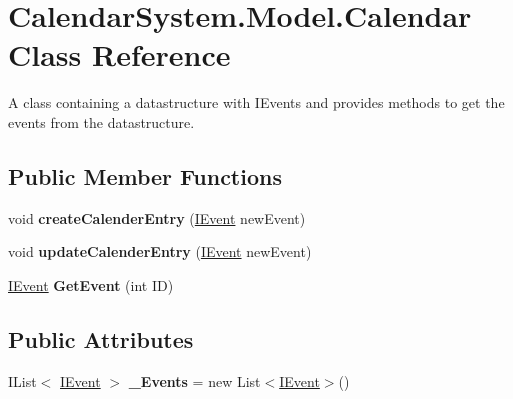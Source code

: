 \hypertarget{class_calendar_system_1_1_model_1_1_calendar}{\section{Calendar\+System.\+Model.\+Calendar Class Reference}
\label{class_calendar_system_1_1_model_1_1_calendar}
}


A class containing a datastructure with I\+Events and provides methods to get the events from the datastructure.  


\subsection*{Public Member Functions}
\begin{DoxyCompactItemize}
\item 
\hypertarget{class_calendar_system_1_1_model_1_1_calendar_a6cc66f6aa80f664dbc35b3bc57adb87a}{void {\bfseries create\+Calender\+Entry} (\hyperlink{interface_calendar_system_1_1_model_1_1_i_event}{I\+Event} new\+Event)}\label{class_calendar_system_1_1_model_1_1_calendar_a6cc66f6aa80f664dbc35b3bc57adb87a}

\item 
\hypertarget{class_calendar_system_1_1_model_1_1_calendar_ae0dc4256f941d67e0971986b14f41b3c}{void {\bfseries update\+Calender\+Entry} (\hyperlink{interface_calendar_system_1_1_model_1_1_i_event}{I\+Event} new\+Event)}\label{class_calendar_system_1_1_model_1_1_calendar_ae0dc4256f941d67e0971986b14f41b3c}

\item 
\hypertarget{class_calendar_system_1_1_model_1_1_calendar_ad76593b64f19feed55728aa35614b5ee}{\hyperlink{interface_calendar_system_1_1_model_1_1_i_event}{I\+Event} {\bfseries Get\+Event} (int I\+D)}\label{class_calendar_system_1_1_model_1_1_calendar_ad76593b64f19feed55728aa35614b5ee}

\end{DoxyCompactItemize}
\subsection*{Public Attributes}
\begin{DoxyCompactItemize}
\item 
\hypertarget{class_calendar_system_1_1_model_1_1_calendar_a58a227cf6bc9025c941e15dc990dea39}{I\+List$<$ \hyperlink{interface_calendar_system_1_1_model_1_1_i_event}{I\+Event} $>$ {\bfseries \+\_\+\+Events} = new List$<$\hyperlink{interface_calendar_system_1_1_model_1_1_i_event}{I\+Event}$>$()}\label{class_calendar_system_1_1_model_1_1_calendar_a58a227cf6bc9025c941e15dc990dea39}

\end{DoxyCompactItemize}


